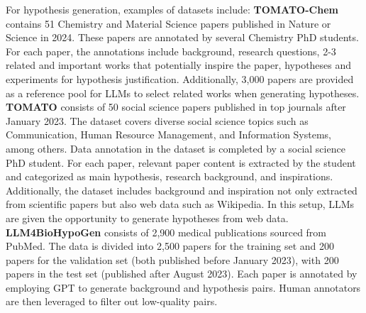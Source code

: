     For hypothesis generation, examples of datasets include: 
    \textbf{TOMATO-Chem} \cite{yang2024moose} contains 51 Chemistry and Material Science papers published in Nature or Science in 2024. These papers are annotated by several  Chemistry PhD students. For each paper, the annotations include background, research questions, 2-3 related and important works that potentially inspire  the paper, hypotheses and experiments for hypothesis justification. Additionally, 3,000 papers are provided as a reference pool for LLMs to select %
    related works when generating hypotheses.
    \textbf{TOMATO} \cite{yang2023large} consists of 50 social science papers published in top journals after January 2023. The dataset covers diverse social science topics such as Communication, Human Resource Management, and Information Systems, among others. Data annotation in the dataset is completed by a social science PhD student. For each paper, relevant paper content is extracted by the student and categorized as main hypothesis, research background, and inspirations. Additionally, the dataset includes background and inspiration not only extracted from scientific papers but also web data such as Wikipedia. In this setup, LLMs are given the opportunity to generate hypotheses from web data.
    \textbf{LLM4BioHypoGen} \cite{qi2024large} consists of 2,900 medical publications sourced from PubMed. The data is divided into 2,500 papers for the training set and 200 papers for the validation set (both published before January 2023), with 200 papers in the test set (published after August 2023). 
    Each paper is annotated by employing GPT to generate background and hypothesis pairs. Human annotators are then leveraged to filter out low-quality pairs.

